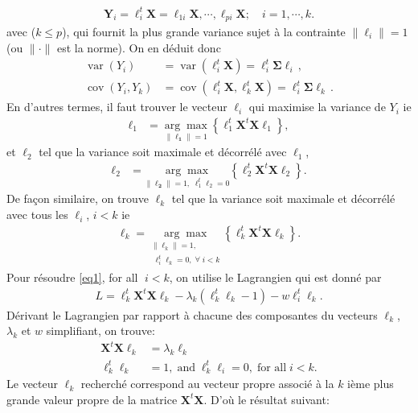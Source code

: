 \begin{align*}
\textbf{Y}_i=\ell^t_i\textbf{X}=\ell_{1i}\textbf{X},\cdots,\ell_{pi}\textbf{X};\quad i=1,\cdots,k.
\end{align*}
avec ($k\leq p$), qui fournit la plus grande variance sujet à la contrainte $\|\ell_i\|=1$ (ou $\|\cdot\| $ est la norme). 
On en déduit donc
\begin{align*}
\operatorname{var}\left(Y_{i}\right) &=\operatorname{var}\left(\ell_{i}^{t} \boldsymbol{X}\right)=\ell_{i}^{t} \boldsymbol{\Sigma} \ell_{i} \,,\\ 
\operatorname{cov}\left(Y_{i}, Y_{k}\right) &=\operatorname{cov}\left(\ell_{i}^{t} \boldsymbol{X}, \ell_{k}^{t} \boldsymbol{X}\right)=\ell_{i}^{t} \boldsymbol{\Sigma} \ell_{k}\, .
\end{align*}
En d'autres termes,  il faut 
trouver le vecteur $\ell_{i}$ qui  maximise la variance de $Y_i$  ie 
\begin{align*}
\mathbf{\ell}_{1}&=\underset{\|\mathbf{\ell_1}\|=1}{\arg \max }\left\{\ell^t_1\mathbf{X}^{t} \mathbf{X} \ell_1\right\},
\end{align*}
et $\ell_2$ tel que la variance soit maximale et décorrélé avec $\ell_1$,   
\begin{align*}
\mathbf{\ell}_{2}& =\underset{\|\mathbf{\ell_2}\|=1,\;\ell_{1}^{t}\ell_{2} =0}{\arg \max }\left\{\ell^t_2\mathbf{X}^{t} \mathbf{X} \ell_2\right\}.
\end{align*}
De façon similaire, on trouve $\ell_k$ tel que la variance soit maximale et décorrélé avec tous les $\ell_i$, $i<k$ ie
\begin{align}
\mathbf{\ell}_k=\underset{\substack{\|\ell_k\|=1,\\ \;\ell_{i}^{t}\ell_k=0,\;\forall\;i<k}}{\arg \max} \left\{\ell^t_k\mathbf{X}^t \mathbf{X} \ell_k\right\}.\label{eq1}
\end{align}
Pour résoudre \eqref{eq1},  for all $\;i<k$, on utilise le Lagrangien qui  est donné par 
\begin{align*}
L=\ell^t_k\mathbf{X}^t \mathbf{X} \ell_k-\lambda_k(\ell^t_k\ell_k-1)-w\ell_{i}^{t}\ell_k.
\end{align*}
Dérivant le Lagrangien par rapport à chacune des composantes du vecteurs $\ell_k$, $\lambda_k$ et $w$ simplifiant, on trouve: 
\begin{align}
\mathbf{X}^t \mathbf{X} \ell_k&=\lambda_k\ell_k\\
\ell^t_k\ell_k&=1,\; \text{and}\; \ell^t_k\ell_i=0,\;\text{for all}\; i<k.
\end{align}
Le vecteur $\ell_k$ recherché correspond au vecteur propre associé à la $k$ ième plus grande  valeur propre de la matrice $\mathbf{X}^t \mathbf{X}$. D'où le résultat suivant:\

